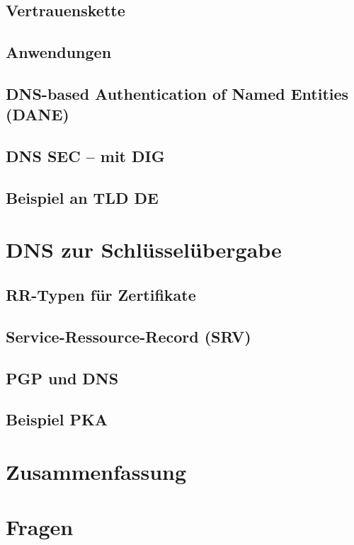\subsection{Vertrauenskette}
\subsection{Anwendungen}
\subsection{DNS-based Authentication of Named Entities (DANE)}
\subsection{DNS SEC -- mit DIG}
\subsection{Beispiel an TLD DE}

\section{DNS zur Schlüsselübergabe}
\subsection{RR-Typen für Zertifikate}
\subsection{Service-Ressource-Record (SRV)}
\subsection{PGP und DNS}
\subsection{Beispiel PKA}

\section{Zusammenfassung}
\section{Fragen}











